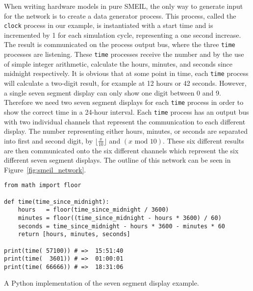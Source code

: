 When writing hardware models in pure SMEIL, the only way to generate input for the network is to create a data generator process. This process, called the \texttt{clock} process in our example, is instantiated with a start time and is incremented by 1 for each simulation cycle, representing a one second increase.
The result is communicated on the process output bus, where the three \texttt{time} processes are listening. These \texttt{time} processes receive the number and by the use of simple integer arithmetic, calculate the hours, minutes, and seconds since midnight respectively. It is obvious that at some point in time, each \texttt{time} process will calculate a two-digit result, for example at 12 hours or 42 seconds. However, a single seven segment display can only show one digit between 0 and 9. Therefore we need two seven segment displays for each \texttt{time} process in order to show the correct time in a 24-hour interval. Each \texttt{time} process has an output bus with two individual channels that represent the communication to each different display. The number representing either hours, minutes, or seconds are separated into first and second digit, by $\lfloor \frac{x}{10} \rfloor$ and $(x \text{ mod } 10)$. These six different results are then communicated onto the six different channels which represent the six different seven segment displays.
The outline of this network can be seen in Figure~\ref{fig:smeil_network}.\\
\begin{listing}
\begin{verbatim}
from math import floor

def time(time_since_midnight):
    hours   = floor(time_since_midnight / 3600)
    minutes = floor((time_since_midnight - hours * 3600) / 60)
    seconds = time_since_midnight - hours * 3600 - minutes * 60
    return [hours, minutes, seconds]

print(time( 57100)) # =>  15:51:40
print(time(  3601)) # =>  01:00:01
print(time( 66666)) # =>  18:31:06
\end{verbatim}
\caption{A Python implementation of the seven segment display example.}
\label{lst:python}
\end{listing}

